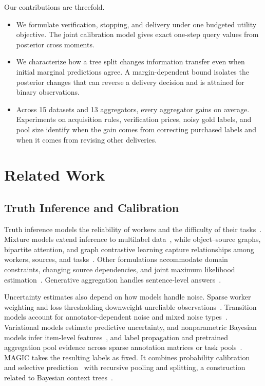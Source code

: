 \documentclass[journal]{IEEEtran}
\begin{document}
Our contributions are threefold.
\begin{itemize}
\item We formulate verification, stopping, and delivery under one budgeted utility objective. The joint calibration model gives exact one-step query values from posterior cross moments.
\item We characterize how a tree split changes information transfer even when initial marginal predictions agree. A margin-dependent bound isolates the posterior changes that can reverse a delivery decision and is attained for binary observations.
\item Across 15 datasets and 13 aggregators, every aggregator gains on average. Experiments on acquisition rules, verification prices, noisy gold labels, and pool size identify when the gain comes from correcting purchased labels and when it comes from revising other deliveries.
\end{itemize}


\section{Related Work}
\label{sec:related}

\subsection{Truth Inference and Calibration}
Truth inference models the reliability of workers and the difficulty of their tasks~\cite{dawid1979maximum,whitehill2009whose}. Mixture models extend inference to multilabel data~\cite{zhang2021multilabel}, while object--source graphs, bipartite attention, and graph contrastive learning capture relationships among workers, sources, and tasks~\cite{wu2023tira,liu2025bat,liu2024govern}. Other formulations accommodate domain constraints, changing source dependencies, and joint maximum likelihood estimation~\cite{ye2022constrained,zhang2026reliable,xiao2023joint}. Generative aggregation handles sentence-level answers~\cite{wang2023generative}.

Uncertainty estimates also depend on how models handle noise. Sparse worker weighting and loss thresholding downweight unreliable observations~\cite{yu2023robust,yang2024dynamic}. Transition models account for annotator-dependent noise and mixed noise types~\cite{li2024transferring,xia2023extended}. Variational models estimate predictive uncertainty, and nonparametric Bayesian models infer item-level features~\cite{morales2022scalable,stinson2025nonparametric}, and label propagation and pretrained aggregation pool evidence across sparse annotation matrices or task pools~\cite{zhang2025eldp,liu2026crowdfm}. MAGIC takes the resulting labels as fixed. It combines probability calibration~\cite{guo2017calibration} and selective prediction~\cite{geifman2017selective} with recursive pooling and splitting, a construction related to Bayesian context trees~\cite{kontoyiannis2022bayesian}.
\end{document}
